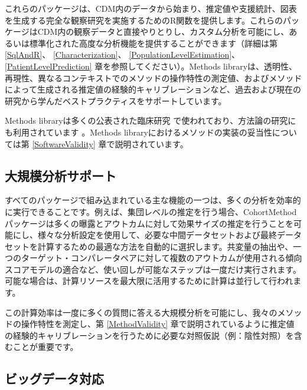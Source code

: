 \documentclass[
  11pt]{book}
\theoremstyle{definition}
\theoremstyle{definition}
\theoremstyle{definition}
\theoremstyle{definition}
\theoremstyle{remark}
\begin{document}
これらのパッケージは、CDM内のデータから始まり、推定値や支援統計、図表を生成する完全な観察研究を実施するためのR関数を提供します。これらのパッケージはCDM内の観察データと直接やりとりし、カスタム分析を可能にし、あるいは標準化された高度な分析機能を提供することができます（詳細は第 \ref{SqlAndR}、 \ref{Characterization}、 \ref{PopulationLevelEstimation}、 \ref{PatientLevelPrediction} 章を参照してください）。Methods libraryは、透明性、再現性、異なるコンテキストでのメソッドの操作特性の測定値、およびメソッドによって生成される推定値の経験的キャリブレーションなど、過去および現在の研究から学んだベストプラクティスをサポートしています。

Methods libraryは多くの公表された臨床研究 \citep{boland_2017, duke_2017, ramcharran_2017, weinstein_2017, wang_2017, ryan_2017, ryan_2018, vashisht_2018, yuan_2018, johnston_2019} で使われており、方法論の研究にも利用されています \citep{schuemie_2014, schuemie_2016, reps2018, tian_2018, schuemie_2018, schuemie_2018b, reps_2019}。Methods libraryにおけるメソッドの実装の妥当性については第 \ref{SoftwareValidity} 章で説明されています。

\subsection{大規模分析サポート}\label{ux5927ux898fux6a21ux5206ux6790ux30b5ux30ddux30fcux30c8}

すべてのパッケージで組み込まれている主な機能の一つは、多くの分析を効率的に実行できることです。例えば、集団レベルの推定を行う場合、CohortMethodパッケージは多くの曝露とアウトカムに対して効果サイズの推定を行うことを可能にし、様々な分析設定を使用して、必要な中間データセットおよび最終データセットを計算するための最適な方法を自動的に選択します。共変量の抽出や、一つのターゲット・コンパレータペアに対して複数のアウトカムが使用される傾向スコアモデルの適合など、使い回しが可能なステップは一度だけ実行されます。可能な場合は、計算リソースを最大限に活用するために計算は並行して行われます。

この計算効率は一度に多くの質問に答える大規模分析を可能にし、我々のメソッドの操作特性を測定し、第 \ref{MethodValidity} 章で説明されているように推定値の経験的キャリブレーションを行うために必要な対照仮説（例：陰性対照）を含むことが重要です。 

\subsection{ビッグデータ対応}\label{BigDataSupport}
\end{document}

